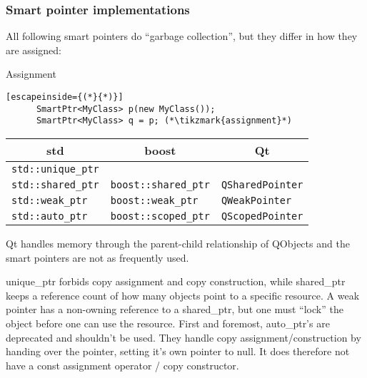 \documentclass[11pt,a4paper,dvipsnames,usenames]{beamer}
\newcommand{\tikzmark}[1]{\tikz[overlay,remember picture] \node (#1) {};}
\begin{document}
\begin{frame}[fragile]
  \frametitle{Smart pointer implementations}

  All following smart pointers do ``garbage collection'', but they differ in how they are assigned:

  \begin{exampleblock}{Assignment}
    \begin{lstlisting}[escapeinside={(*}{*)}]
      SmartPtr<MyClass> p(new MyClass());
      SmartPtr<MyClass> q = p; (*\tikzmark{assignment}*)
    \end{lstlisting}
  \end{exampleblock}


  \begin{center}
    \begin{tabular}{|l|l|l|} \hline
      \multicolumn{1}{|c|}{\textbf{std}} & 
      \multicolumn{1}{|c|}{\textbf{boost}} & 
      \multicolumn{1}{|c|}{\textbf{Qt}} \\ \hline
      \lstinline!std::unique_ptr! & & \\ \hline
      \lstinline!std::shared_ptr! & \lstinline!boost::shared_ptr! & \lstinline!QSharedPointer! \\ \hline
      \lstinline!std::weak_ptr! & \lstinline!boost::weak_ptr! & \lstinline!QWeakPointer! \\ \hline
      \lstinline!std::auto_ptr! & \lstinline!boost::scoped_ptr! & \lstinline!QScopedPointer! \\ \hline
    \end{tabular}
  \end{center}

  \note
  {
    Qt handles memory through the parent-child relationship of QObjects and the smart pointers are not as
    frequently used. 

    unique\_ptr forbids copy assignment and copy construction, while shared\_ptr keeps a reference count
    of how many objects point to a specific resource. A weak pointer has a non-owning reference to a 
    shared\_ptr, but one must ``lock'' the object before one can use the resource. First and foremost, 
    auto\_ptr's are deprecated and shouldn't be used. They handle copy assignment/construction by
    handing over the pointer, setting it's own pointer to null. It does therefore not have a 
    const assignment operator / copy constructor.
  }

\end{frame}
\end{document}
